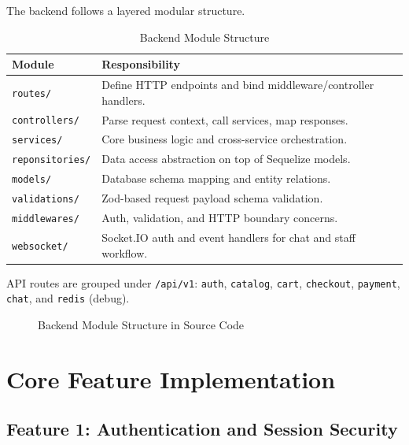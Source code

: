 The backend follows a layered modular structure.

\begin{table}[H]
\centering
\caption{Backend Module Structure}
\label{tab:impl-module-structure}
\begin{tabular}{|p{3.2cm}|p{8.2cm}|}
\hline
\textbf{Module} & \textbf{Responsibility} \\
\hline
\texttt{routes/} & Define HTTP endpoints and bind middleware/controller handlers. \\
\hline
\texttt{controllers/} & Parse request context, call services, map responses. \\
\hline
\texttt{services/} & Core business logic and cross-service orchestration. \\
\hline
\texttt{reponsitories/} & Data access abstraction on top of Sequelize models. \\
\hline
\texttt{models/} & Database schema mapping and entity relations. \\
\hline
\texttt{validations/} & Zod-based request payload schema validation. \\
\hline
\texttt{middlewares/} & Auth, validation, and HTTP boundary concerns. \\
\hline
\texttt{websocket/} & Socket.IO auth and event handlers for chat and staff workflow. \\
\hline
\end{tabular}
\end{table}

API routes are grouped under \texttt{/api/v1}: \texttt{auth}, \texttt{catalog}, \texttt{cart}, \texttt{checkout}, \texttt{payment}, \texttt{chat}, and \texttt{redis} (debug).

\begin{figure}[H]
\centering
{}
\caption{Backend Module Structure in Source Code}
\label{fig:impl-module-structure}
\end{figure}

\section{Core Feature Implementation}

\subsection{Feature 1: Authentication and Session Security}


